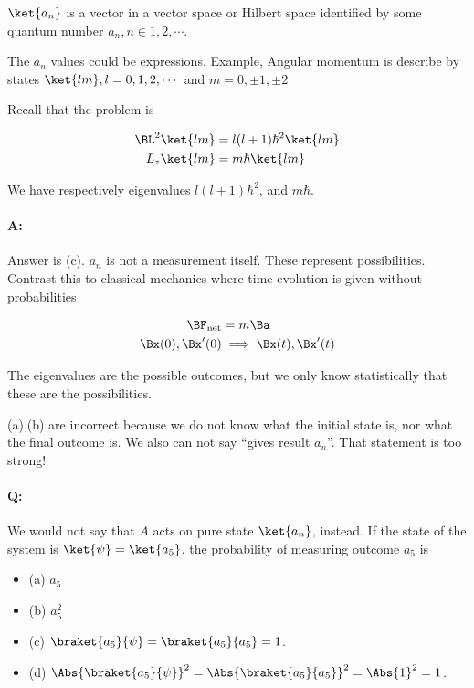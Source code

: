 $\ket{a_n}$ is a vector in a vector space or Hilbert space identified by some quantum number $a_n, n \in 1,2, \cdots$.

The $a_n$ values could be expressions.  Example, Angular momentum is describe by states $\ket{lm}, l = 0,1,2,\cdots$ and $m = 0, \pm 1, \pm 2$

Recall that the problem is

\begin{align}\label{eqn:PHY356HNov2:10}
\BL^2 \ket{lm} &= l(l+1) \hbar^2 \ket{lm} \\
L_z \ket{lm} &= m \hbar \ket{lm}
\end{align}

We have respectively eigenvalues $l(l+1)\hbar^2$, and $m \hbar$.

\paragraph{A:} Answer is (c).  $a_n$ is not a measurement itself.  These represent possibilities.  Contrast this to classical mechanics where time evolution is given without probabilities

\begin{align}\label{eqn:PHY356HNov2:20}
\BF_{\text{net}} &= m \Ba \\
\Bx(0), \Bx'(0) &\implies \Bx(t), \Bx'(t)
\end{align}

The eigenvalues are the possible outcomes, but we only know statistically that these are the possibilities.

(a),(b) are incorrect because we do not know what the initial state is, nor what the final outcome is.  We also can not say ``gives result $a_n$''.  That statement is too strong!

\paragraph{Q:} We would not say that $A$ acts on pure state $\ket{a_n}$, instead.  If the state of the system is $\ket{\psi} = \ket{a_5}$, the probability of measuring outcome $a_5$ is
\begin{itemize}
\item (a) $a_5$
\item (b) $a_5^2$
\item (c) $\braket{a_5}{\psi} = \braket{a_5}{a_5} = 1$.
\item (d) $\Abs{\braket{a_5}{\psi}}^2 = \Abs{\braket{a_5}{a_5}}^2 = \Abs{1}^2 = 1$.
\end{itemize}

